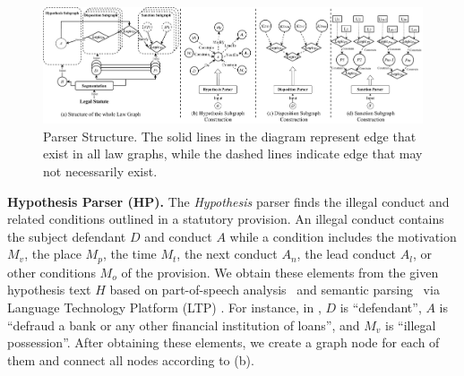 \begin{figure}
    \centering    \includegraphics[width=0.98\linewidth]{figs/Law Graph Structure.pdf}
    \caption{\lawgraph{} Parser Structure. The solid lines in the diagram represent edge that exist in all law graphs, while the dashed lines indicate edge that may not necessarily exist.
    }
    \label{fig:law-graph-parser-structure}
\end{figure}

\textbf{Hypothesis Parser (HP).} The \textit{Hypothesis} parser finds the illegal conduct and related conditions outlined in a statutory provision. An illegal conduct contains the subject defendant $D$ and conduct $A$ while a condition includes the motivation $M_v$, the place $M_p$, the time $M_t$, the next conduct $A_n$, the lead conduct $A_l$, or other conditions $M_o$ of the provision. We obtain these elements from the given hypothesis text $H$ based on part-of-speech analysis~\cite{chiche2022part} and semantic parsing~\cite{lindemann-etal-2019-compositional} via Language Technology Platform (LTP) \cite{che-etal-2010-ltp}. 
For instance, in , $D$ is ``defendant'', $A$ is ``defraud a bank or any other financial institution of loans'', and $M_v$ is ``illegal possession''. 
After obtaining these elements, we create a graph node for each of them and connect all nodes according to  (b). 


